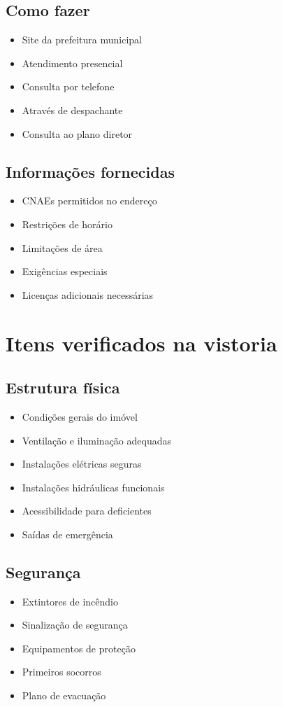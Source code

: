 \documentclass[12pt,a4paper]{article}
\begin{document}
\subsection{Como fazer}
\begin{itemize}
    \item Site da prefeitura municipal
    \item Atendimento presencial
    \item Consulta por telefone
    \item Através de despachante
    \item Consulta ao plano diretor
\end{itemize}

\subsection{Informações fornecidas}
\begin{itemize}
    \item CNAEs permitidos no endereço
    \item Restrições de horário
    \item Limitações de área
    \item Exigências especiais
    \item Licenças adicionais necessárias
\end{itemize}

\section{Itens verificados na vistoria}

\subsection{Estrutura física}
\begin{itemize}
    \item Condições gerais do imóvel
    \item Ventilação e iluminação adequadas
    \item Instalações elétricas seguras
    \item Instalações hidráulicas funcionais
    \item Acessibilidade para deficientes
    \item Saídas de emergência
\end{itemize}

\subsection{Segurança}
\begin{itemize}
    \item Extintores de incêndio
    \item Sinalização de segurança
    \item Equipamentos de proteção
    \item Primeiros socorros
    \item Plano de evacuação
\end{itemize}
\end{document}
